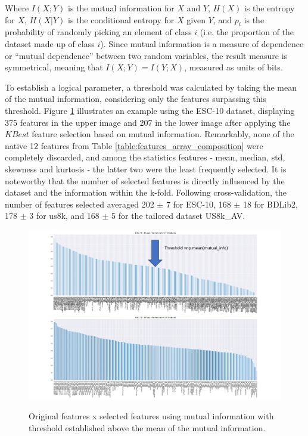 Where $I(X ; Y)$ is the mutual information for $X$ and $Y$, $H(X)$ is the entropy for $X$, $H(X | Y)$ is the conditional entropy for $X$ given $Y$, and $p_i$ is the probability of randomly picking an element of class $i$ (i.e. the proportion of the dataset made up of class $i$). Since mutual information is a measure of dependence or “mutual dependence” between two random variables, the result measure is symmetrical, meaning that $I(X ; Y) = I(Y ; X)$, measured as units of bits.

To establish a logical parameter, a threshold was calculated by taking the mean of the mutual information, considering only the features surpassing this threshold. Figure \ref{fig:results_mutual_information} illustrates an example using the ESC-10 dataset, displaying 375 features in the upper image and 207 in the lower image after applying the $KBest$ feature selection based on mutual information. Remarkably, none of the native 12 features from Table \ref{table:features_array_composition} were completely discarded, and among the statistics features - mean, median, std, skewness and kurtosis - the latter two were the least frequently selected. It is noteworthy that the number of selected features is directly influenced by the dataset and the information within the k-fold. Following cross-validation, the number of features selected averaged 202 $\pm$ 7 for ESC-10, 168 $\pm$ 18 for BDLib2, 178 $\pm$ 3 for \gls{us8k}, and 168 $\pm$ 5 for the tailored dataset US8k\_AV.

\begin{figure}[htbp]
    \raggedright
        \caption{Original features x selected features using mutual information with threshold established above the mean of the mutual information.}
        \includegraphics[width=1\textwidth]{resources/images/060-results/Results_classification_mutual_information_1.png}
        \label{fig:results_mutual_information}
\end{figure}

